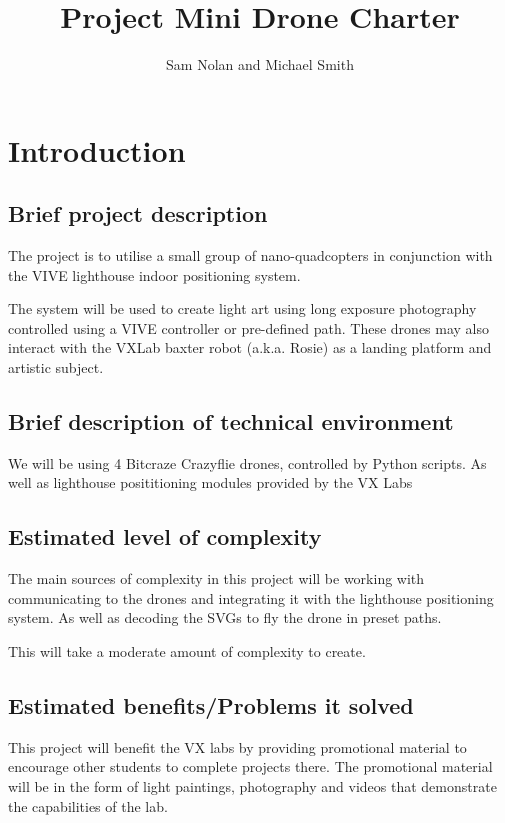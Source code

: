 \documentclass{article}
\author{Sam Nolan and Michael Smith}
\title{Project Mini Drone Charter}
\begin{document}
  \maketitle

  \section{Introduction}
  \subsection{Brief project description}
  The project is to utilise a small group of nano-quadcopters in conjunction with the VIVE lighthouse indoor positioning system. 

  The system will be used to create light art using long exposure photography controlled 
  using a VIVE controller or pre-defined path. These drones may also interact with the VXLab 
  baxter robot (a.k.a. Rosie) as a landing platform and artistic subject.

  \subsection{Brief description of technical environment}
  We will be using 4 Bitcraze Crazyflie drones, controlled by Python scripts. 
  As well as lighthouse posititioning modules provided by the VX Labs

  \subsection{Estimated level of complexity}
  The main sources of complexity in this project will be working with communicating to the 
  drones and integrating it with the lighthouse positioning system. As well as decoding the SVGs
  to fly the drone in preset paths.

  This will take a moderate amount of complexity to create.

  \subsection{Estimated benefits/Problems it solved}
   
  This project will benefit the VX labs by providing promotional material to encourage other
  students to complete projects there. The promotional material will be in the form of light
  paintings, photography and videos that demonstrate the capabilities of the lab.
\end{document}

